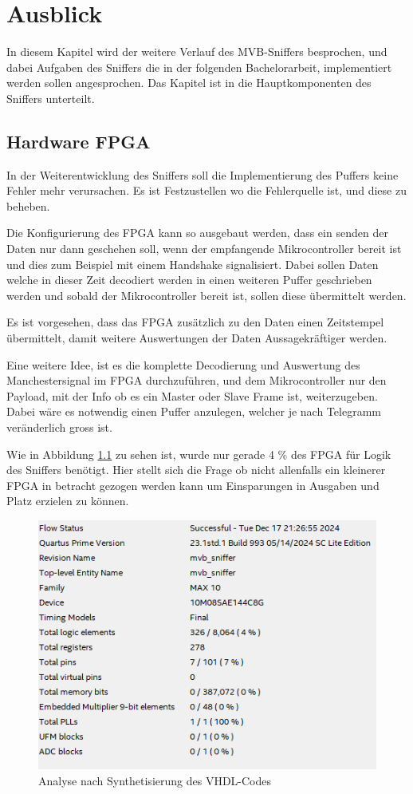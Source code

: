 \chapter{Ausblick} %
\label{chapter6:Ausblick} %

In diesem Kapitel wird der weitere Verlauf des MVB-Sniffers besprochen, und dabei Aufgaben des Sniffers die in der folgenden Bachelorarbeit, implementiert werden sollen angesprochen.
Das Kapitel ist in die Hauptkomponenten des Sniffers unterteilt.


\section{Hardware FPGA}
\label{sec:AusblickHardwareFPGA}
In der Weiterentwicklung des Sniffers soll die Implementierung des Puffers keine Fehler mehr verursachen. Es ist Festzustellen wo die Fehlerquelle ist, und diese zu beheben.

Die Konfigurierung des FPGA kann so ausgebaut werden, dass ein senden der Daten nur dann geschehen soll, wenn der empfangende Mikrocontroller bereit ist und dies zum Beispiel mit einem Handshake signalisiert. Dabei sollen Daten welche in dieser Zeit decodiert werden in einen weiteren Puffer geschrieben werden und sobald der Mikrocontroller bereit ist, sollen diese übermittelt werden.

Es ist vorgesehen, dass das FPGA zusätzlich zu den Daten einen Zeitstempel übermittelt, damit weitere Auswertungen der Daten Aussagekräftiger werden.

Eine weitere Idee, ist es die komplette Decodierung und Auswertung des Manchestersignal im FPGA durchzuführen, und dem Mikrocontroller nur den Payload, mit der Info ob es ein Master oder Slave Frame ist, weiterzugeben. Dabei wäre es notwendig einen Puffer anzulegen, welcher je nach Telegramm veränderlich gross ist. 

Wie in Abbildung \ref{fig:FPGAanalyse} zu sehen ist, wurde nur gerade 4 \% des FPGA für Logik des Sniffers benötigt. Hier stellt sich die Frage ob nicht allenfalls ein kleinerer FPGA in betracht gezogen werden kann um Einsparungen in Ausgaben und Platz erzielen zu können.\\

\begin{figure}[H]
    \centering
    \includegraphics[width=0.55\linewidth]{Figures/Chap6/FPGA/quartus_analyzer.PNG}
    \caption{Analyse nach Synthetisierung des VHDL-Codes}
    \label{fig:FPGAanalyse}
\end{figure}



